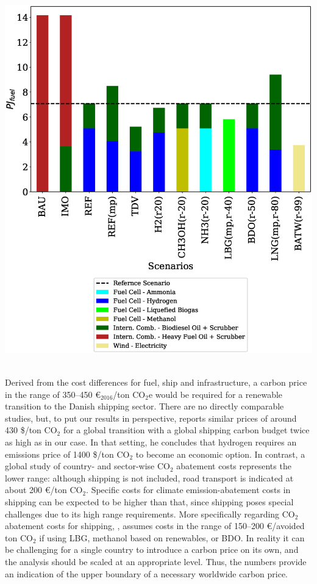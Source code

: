\documentclass[article]{elsarticle}
\begin{document}
\begin{minipage}[t]{0.49\textwidth}
    \centering
    \captionsetup{justification=centering}
    \includegraphics[width=.95\textwidth]{figures/AllFuel2050.eps}
    \label{fig:AllFuel2050}
\end{minipage}\\ %

Derived from the cost differences for fuel, ship and infrastructure, a carbon price in the range of 350--450 \euro$_{2016}$/ton CO$_2$e would be required for a renewable transition to the Danish shipping sector. There are no directly comparable studies, but, to put our results in perspective, \citet[p.197]{Raucci2017} reports similar prices of around 430 \$/ton CO$_2$ for a global transition with a global shipping carbon budget twice as high as in our case. In that setting, he concludes that hydrogen requires an emissions price of 1400 \$/ton CO$_2$ to become an economic option. In contrast, a global study of country- and sector-wise CO$_2$ abatement costs \cite{OECD2016} represents the lower range: although shipping is not included, road transport is indicated at about 200 \euro/ton CO$_2$. Specific costs for climate emission-abatement costs in shipping can be expected to be higher than that, since shipping poses special challenges due to its high range requirements. More specifically regarding CO$_2$ abatement costs for shipping, \citet{DNVGL2017}, assumes costs in the range of 150--200 \euro/avoided ton CO$_2$ if using LBG, methanol based on renewables, or BDO. In reality it can be challenging for a single country to introduce a carbon price on its own, and the analysis should be scaled at an appropriate level. Thus, the numbers provide an indication of the upper boundary of a necessary worldwide carbon price.
\end{document}
